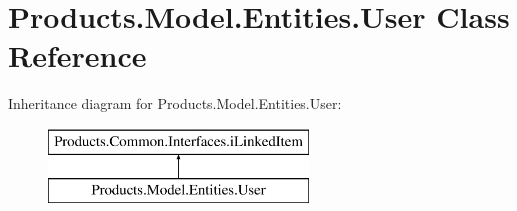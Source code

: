 \hypertarget{class_products_1_1_model_1_1_entities_1_1_user}{}\section{Products.\+Model.\+Entities.\+User Class Reference}
\label{class_products_1_1_model_1_1_entities_1_1_user}
Inheritance diagram for Products.\+Model.\+Entities.\+User\+:\begin{figure}[H]
\begin{center}
\leavevmode
\includegraphics[height=2.000000cm]{class_products_1_1_model_1_1_entities_1_1_user}
\end{center}
\end{figure}
